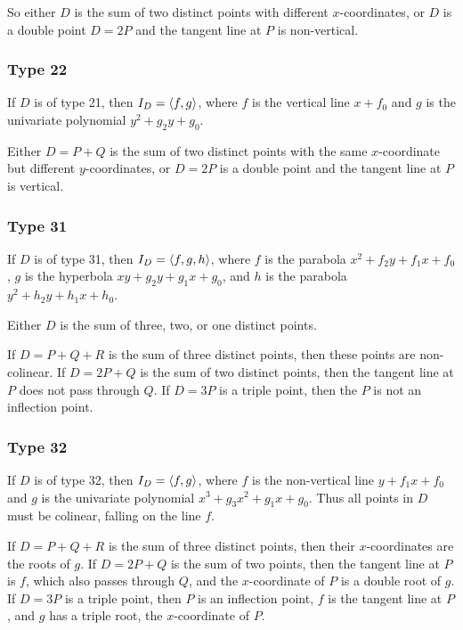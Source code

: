   So either $D$ is the sum of two distinct points with different $x$-coordinates,
  or $D$ is a double point $D = 2P$ and the tangent line at $P$ is non-vertical.

\subsubsection{Type 22}
  If $D$ is of type 21, then $I_D = \left\langle f, g \right\rangle$, where $f$ is the vertical line $x + f_0$
  and $g$ is the univariate polynomial $y^2 + g_2y + g_0$.
  
  Either $D = P + Q$ is the sum of two distinct points with the same $x$-coordinate but different $y$-coordinates,
  or $D = 2P$ is a double point and the tangent line at $P$ is vertical.

\subsubsection{Type 31}
  If $D$ is of type 31, then $I_D = \left\langle f, g, h \right\rangle$, where $f$ is the parabola $x^2 + f_2y + f_1x + f_0$,
  $g$ is the hyperbola $xy + g_2y + g_1x + g_0$, and $h$ is the parabola $y^2 + h_2y + h_1x + h_0$.
  
  Either $D$ is the sum of three, two, or one distinct points.
  
  If $D = P + Q + R$ is the sum of three distinct points, then these points are non-colinear.
  If $D = 2P + Q$ is the sum of two distinct points, then the tangent line at $P$ does not pass through $Q$.
  If $D = 3P$ is a triple point, then the $P$ is not an inflection point.

\subsubsection{Type 32}
  If $D$ is of type 32, then $I_D = \left\langle f, g \right\rangle$, where $f$ is the non-vertical line $y + f_1x + f_0$
  and $g$ is the univariate polynomial $x^3 + g_3x^2 + g_1x + g_0$.
  Thus all points in $D$ must be colinear, falling on the line $f$.
  
  If $D = P + Q + R$ is the sum of three distinct points, then their $x$-coordinates are the roots of $g$.
  If $D = 2P + Q$ is the sum of two points, then the tangent line at $P$ is $f$, which also passes through $Q$,
  and the $x$-coordinate of $P$ is a double root of $g$.
  If $D = 3P$ is a triple point, then $P$ is an inflection point, $f$ is the tangent line at $P$, and $g$ has a triple root,
  the $x$-coordinate of $P$.

